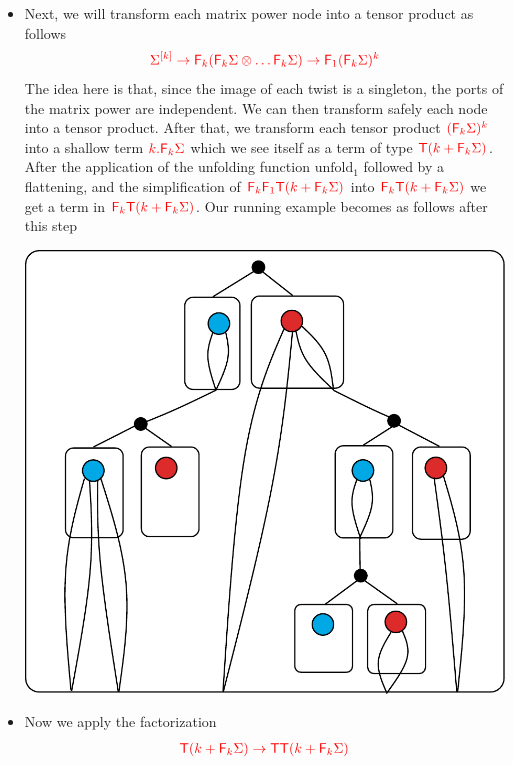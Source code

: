 \begin{example}
\begin{itemize}
\begin{center}
 \end{center}
 \item Next, we will transform each matrix power node into a tensor product as follows 
 \begin{align*}
 {\color{red}{ \Sigma^{[k]} \rightarrow {\color{red}{\mathsf F_{k}}}({\color{red}{\mathsf F_{k}}}\Sigma \otimes \dots {\color{red}{\mathsf F_{k}}}\Sigma) \to {\color{red}{\mathsf F_{1}}}({\color{red}{\mathsf F_{k}}}\Sigma)^k}}
 \end{align*}
 The idea here is that, since the image of each twist is a singleton,  the ports of the matrix power are independent. We can then transform safely each node into a tensor product. After that, we transform each tensor product ${\color{red}{({\color{red}{\mathsf F_{k}}}\Sigma)^k}}$ into a shallow term ${\color{red}{k.{\color{red}{\mathsf F_{k}}}\Sigma}}$ which we see itself as a term of type ${\color{red}{{\color{red}{\mathsf T}}(k+{\color{red}{\mathsf F_{k}}}\Sigma)}}$. After the application of the unfolding function $\mathrm{unfold}_1$ followed by a flattening, and the simplification of ${\color{red}{{\color{red}{\mathsf F_{k}}}{\color{red}{\mathsf F_{1}}}{\color{red}{\mathsf T}}(k+{\color{red}{\mathsf F_{k}}}\Sigma)}}$ into ${\color{red}{{\color{red}{\mathsf F_{k}}}{\color{red}{\mathsf T}}(k+{\color{red}{\mathsf F_{k}}}\Sigma)}}$ we get a term in ${\color{red}{{\color{red}{\mathsf F_{k}}}{\color{red}{\mathsf T}}(k+{\color{red}{\mathsf F_{k}}}\Sigma)}}$. Our running example becomes as follows after this step
   \begin{center}
\includegraphics[scale=.3]{one-unfold2.pdf}
 \end{center}
 \item Now we apply the factorization 
 \begin{align*}
 \ranked{\tmonad (k + \reduce k \Sigma)\to \tmonad \tmonad(k + \reduce k \Sigma)}

\end{align*}
\end{itemize}
\end{example}
